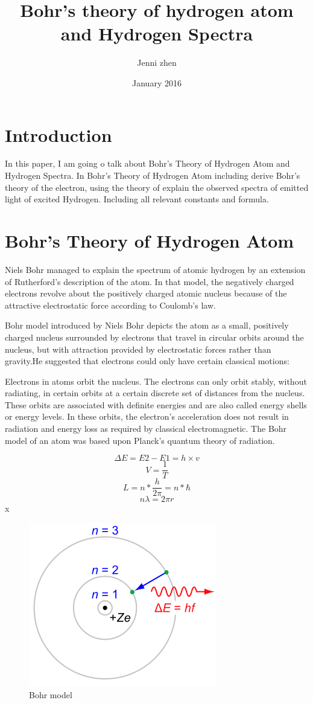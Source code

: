 \documentclass{article}
\title{Bohr's theory of hydrogen atom and Hydrogen Spectra}
\author{Jenni zhen }
\date{January 2016}
\begin{document}
\maketitle

\section{Introduction}
  In this paper, I am going o talk about Bohr's Theory of Hydrogen Atom and Hydrogen Spectra. In Bohr's Theory of Hydrogen Atom including derive Bohr's theory of the electron, using the theory of explain the observed spectra of emitted light of excited Hydrogen. Including all relevant constants and formula.
  
  
\section{Bohr's Theory of Hydrogen Atom}  
  Niels Bohr managed to explain the spectrum of atomic hydrogen by an extension of Rutherford's description of the atom. In that model, the negatively charged electrons revolve about the positively charged atomic nucleus because of the attractive electrostatic force according to Coulomb's law.

  Bohr model introduced by Niels Bohr depicts the atom as a small, positively charged nucleus surrounded by electrons that travel in circular orbits around the nucleus, but with attraction provided by electrostatic forces rather than gravity.He suggested that electrons could only have certain classical motions:

  Electrons in atoms orbit the nucleus.
  The electrons can only orbit stably, without radiating, in certain orbits at a certain discrete set of distances from the nucleus. These orbits are associated with definite energies and are also called energy shells or energy levels. In these orbits, the electron's acceleration does not result in radiation and energy loss as required by classical electromagnetic. The Bohr model of an atom was based upon Planck's quantum theory of radiation.

  
  $$ \Delta E=E2-E1=h\times v $$
  $$ V=\frac{1}{T}$$
  $$ L=n*\frac {h}{2\pi}=n*\hbar$$
  $$ n\lambda={2}{\pi}{r}$$
x
\begin{figure}[h!]
\centering
\includegraphics{1.png}
\caption{Bohr model}
\label{fig:Bohr model}
\end{figure}
\end{document}
